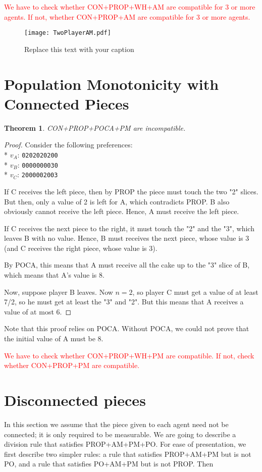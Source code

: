 \documentclass[a4paper,12pt]{article}
\newcommand{\triexample}[3]{ \\
* \hspace{1cm}   $v_A$: \texttt{#1} \\
* \hspace{1cm}   $v_B$: \texttt{#2} \\
* \hspace{1cm}   $v_C$: \texttt{#3}
}
\newtheorem{thm}{Theorem}[section]
\begin{document}
\textcolor{red}{
We have to check whether CON+PROP+WH+AM are compatible for 3 or more agents.
If not, whether CON+PROP+AM are compatible for 3 or more agents.
}


\begin{figure}[h!]
\begin{center}
\texttt{[image: TwoPlayerAM.pdf]}
\caption{Replace this text with your caption%
}
\end{center}
\end{figure}

\section{Population Monotonicity with Connected Pieces}

\begin{thm}
CON+PROP+POCA+PM are incompatible.
\end{thm}

\begin{proof}
Consider the following preferences:
\triexample{0202020200}{0000000030}{2000002003}
If C receives the left piece, then by PROP the piece must touch the two "2" slices.
But then, only a value of 2 is left for A, which contradicts PROP.
B also obviously cannot receive the left piece.
Hence, A must receive the left piece.

If C receives the next piece to the right, it must touch the "2" and the "3", which leaves B with no value. Hence, B must receives the next piece, whose value is 3 (and C receives the right piece, whose value is 3).

By POCA, this means that A must receive all the cake up to the "3" slice of B, which means that A's value is 8.

Now, suppose player B leaves. Now $n=2$, so player C must get a value of at least 7/2, so he must get at least the "3" and "2". But this means that A receives a value of at most 6.
\end{proof}

Note that this proof relies on POCA. Without POCA, we could not prove that the initial value of A must be 8.

\textcolor{red}{
We have to check whether CON+PROP+WH+PM are compatible.
If not, check whether    CON+PROP+PM are compatible.
}




\section{Disconnected pieces}
In this section we assume that the piece given to each agent need not be connected; it is only required to be measurable. We are going to describe a division rule that satisfies PROP+AM+PM+PO. For ease of presentation, we first describe two simpler rules: a rule that satisfies PROP+AM+PM but is not PO, and a rule that satisfies PO+AM+PM but is not PROP. Then
\end{document}

